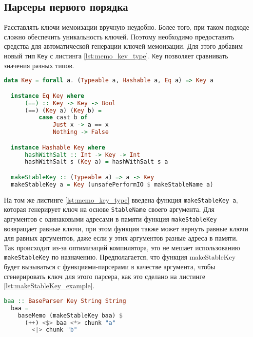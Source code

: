 \documentclass[times]{itmo-student-thesis}
\begin{document}
\subsection{Парсеры первого порядка}

Расставлять ключи мемоизации вручную неудобно. Более того, при таком подходе сложно обеспечить уникальность ключей. Поэтому
необходимо предоставить средства для автоматической генерации ключей мемоизации. Для этого добавим новый тип \lstinline{Key} 
с листинга \ref{lst:memo_key_type}. \lstinline{Key} позволяет сравнивать значения разных типов. 

\begin{lstlisting}[language=Haskell,float=!h,caption={Тип ключей мемоизации},label={lst:memo_key_type}]
  data Key = forall a. (Typeable a, Hashable a, Eq a) => Key a

  instance Eq Key where
      (==) :: Key -> Key -> Bool
      (==) (Key a) (Key b) =
          case cast b of
              Just x -> a == x
              Nothing -> False

  instance Hashable Key where
      hashWithSalt :: Int -> Key -> Int
      hashWithSalt s (Key a) = hashWithSalt s a

  makeStableKey :: (Typeable a) => a -> Key
  makeStableKey a = Key (unsafePerformIO $ makeStableName a)
\end{lstlisting}

На том же листинге \ref{lst:memo_key_type} введена функция \lstinline{makeStableKey a}, которая генерирует ключ на основе
\lstinline{StableName}\cite{noauthor_systemmemstablename_nodate}
своего аргумента. Для аргументов с одинаковыми адресами в памяти функция \lstinline{makeStableKey} возвращает равные ключи,
при этом функция также может вернуть равные ключи для равных аргументов, даже если у этих аргументов разные адреса в
памяти. Так происходит из-за оптимизаций компилятора, это не мешает использованию \lstinline{makeStableKey} по назначению.
Предполагается, что функция makeStableKey будет вызываться с функциями-парсерами в качестве аргумента, чтобы
сгенерировать ключ для этого парсера, как это сделано на листинге \ref{lst:makeStableKey_example}.

\begin{lstlisting}[language=Haskell,float=!h,caption={Пример использования makeStableKey},label={lst:makeStableKey_example}]
  baa :: BaseParser Key String String
  baa =
    baseMemo (makeStableKey baa) $
      (++) <$> baa <*> chunk "a"
        <|> chunk "b"
\end{lstlisting}
\end{document}
